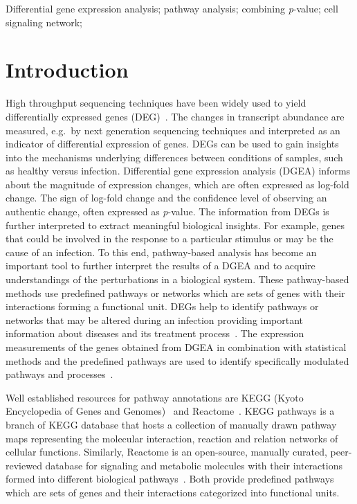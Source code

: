 \documentclass[10pt,a4paper,twocolumn]{article}
\begin{document}
	Differential gene expression analysis; pathway analysis; combining \textit{p}-value; cell signaling network;
	
	\clearpage
	
	\section*{Introduction}
	
	High throughput sequencing techniques have been widely used to yield
	differentially expressed genes (DEG)~\cite{DEG}. The changes in
	transcript abundance are measured, e.g.~by next generation sequencing
	techniques and interpreted as an indicator of differential expression of
	genes. DEGs can be used to gain insights into the mechanisms underlying differences between conditions of samples, such as healthy versus infection. Differential gene expression analysis (DGEA) informs about the
	magnitude of expression changes, which are often
	expressed as log-fold change. The sign of log-fold change and the confidence level of
	observing an authentic change, often expressed as \textit{p}-value. The information from DEGs is further interpreted to extract meaningful biological
	insights. For example, genes that could be involved in the response to a
	particular stimulus or may be the cause of an infection. To this end, pathway-based analysis has become an important tool to further interpret
	the results of a DGEA and to acquire understandings of the perturbations in
	a biological system. These pathway-based methods use predefined pathways or
	networks which are sets of genes with their
	interactions forming a functional unit. DEGs help to identify pathways or
	networks that may be altered during an infection providing
	important information about diseases and its treatment
	process~\cite{Khatri2012}. The
	expression measurements of the genes obtained from DGEA in combination with
	statistical methods and the predefined pathways are used to identify specifically modulated
	pathways and processes~\cite{Campos}. 
	
	
	Well established resources for pathway annotations are KEGG (Kyoto
	Encyclopedia of Genes and Genomes)~\cite{Kegg} and Reactome~\cite{Reactome}. KEGG pathways is a branch of KEGG database that
	hosts a collection of manually drawn pathway maps representing the
	molecular interaction, reaction and relation networks of cellular
	functions. Similarly, Reactome is an open-source, manually curated,
	peer-reviewed database for signaling and metabolic molecules with their
	interactions formed into different biological pathways~\cite{Reactome}. Both provide predefined pathways which are sets of
	genes and their interactions categorized into functional units.
	
\end{document}
